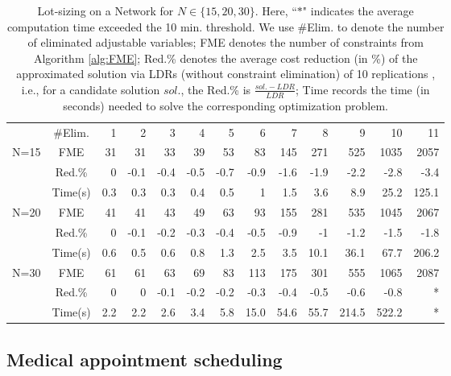 \documentclass[fleqn,isre,blindrev]{informs4}
\begin{document}
\begin{table*}[t]
			\centering
			\caption{Lot-sizing on a Network for $N\in \{15,20,30\}$. Here, ``$*$" indicates the average computation time exceeded the 10 min. threshold. We use \#Elim. to denote the number of eliminated adjustable variables; FME denotes the number of constraints from Algorithm \ref{alg:FME}; Red.\% denotes the average cost reduction (in \%) of the approximated solution via LDRs (without constraint elimination) of 10 replications , i.e., for a candidate solution $sol.$, the Red.\% is $\frac{sol. - LDR}{LDR}$; Time records the time (in seconds) needed to solve the corresponding optimization problem.}
\def\arraystretch{1.3}			\begin{tabular}{cc|rrrrrrrrrrr}
				\cline{2-13}
				& \#Elim. & 1     & 2     & 3     & 4     & 5     & 6     & 7     & 8     & 9     & 10    & 11 \\ \cline{2-13}
				\multirow{3}{*}{N=15} &  FME  & 31     & 31  & 33     & 39     & 53     & 83     & 145     & 271     & 525     & 1035    & 2057   \\ 
				 & Red.\% & 0     & -0.1  & -0.4  & -0.5  & -0.7  & -0.9  & -1.6  & -1.9  & -2.2  & -2.8  & -3.4 \\
				& Time(s)  & 0.3   & 0.3   & 0.3   & 0.4   & 0.5   & 1     & 1.5   & 3.6   & 8.9   & 25.2  & 125.1 \\ \cline{2-13}
			\multirow{3}{*}{N=20} &  FME  & 41     & 41  & 43     & 49     & 63     & 93     & 155     & 281     & 535     & 1045    & 2067   \\ 
				 & Red.\% & 0     & -0.1  & -0.2  & -0.3  & -0.4  & -0.5  & -0.9  & -1    & -1.2  & -1.5  & -1.8 \\
				& Time(s)  & 0.6   & 0.5   & 0.6   & 0.8   & 1.3   & 2.5   & 3.5   & 10.1  & 36.1  & 67.7  & 206.2 \\ \cline{2-13}
			\multirow{3}{*}{N=30} &  FME  & 61     & 61  & 63     & 69     & 83     & 113     & 175     & 301     & 555     & 1065    & 2087   \\
				 & Red.\% & 0     & 0     & -0.1  & -0.2  & -0.2  & -0.3  & -0.4  & -0.5  & -0.6  & -0.8  & * \\
				& Time(s)  & 2.2   & 2.2   & 2.6   & 3.4   & 5.8   & 15.0  & 54.6  & 55.7  & 214.5 & 522.2   & * \\ \cline{2-13}
			\end{tabular}%
			\label{tab:lsonb}%
		\end{table*}%
		
		
		\subsection{Medical appointment scheduling} \label{sec:asproblem}
		
\end{document}
